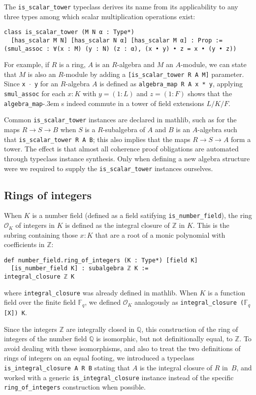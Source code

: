 \documentclass[sn-mathphys]{sn-jnl}%
\newcommand{\lean}[1]{\texttt{#1}\xspace}
\newcommand*{\OK}[1][K]{\mathcal{O}_{#1}}
\newcommand*{\Fq}[1][q]{\mathbb{F}_{#1}}
\newcommand{\mathlib}{\textsf{mathlib}\xspace}
\newcommand{\QQ}{\mathbb{Q}}
\renewcommand{\Z}{\mathbb{Z}}
\begin{document}
The \lean{is\_scalar\_tower} typeclass derives its name from its applicability to any three types among which scalar multiplication operations exist:
\begin{lstlisting}
class is_scalar_tower (M N α : Type*)
  [has_scalar M N] [has_scalar N α] [has_scalar M α] : Prop :=
(smul_assoc : ∀(x : M) (y : N) (z : α), (x • y) • z = x • (y • z))
\end{lstlisting}
For example, if $R$ is a ring, $A$ is an $R$-algebra and $M$ an $A$-module, we can state that $M$ is also an $R$-module by adding a \lean{[is\_scalar\_tower R A M]} parameter.
Since \lean{x~$\cdot$~y} for an $R$-algebra $A$ is defined as \lean{algebra\_map R A x * y}, applying \lean{smul\_assoc} for each $x : K$ with $y = (1 : L)$ and $z = (1 : F)$ shows that the \lean{algebra\_map}\kern-.3em s indeed commute in a tower of field extensions $L / K / F$.

Common \lean{is\_scalar\_tower} instances are declared in \mathlib,
such as for the maps $R \to S \to B$ when $S$ is a $R$-subalgebra of $A$ and $B$ is an $A$-algebra such that \lean{is\_scalar\_tower R A B};
this also implies that the maps $R \to S \to A$ form a tower.
The effect is that almost all coherence proof obligations are automated through typeclass instance synthesis.
Only when defining a new algebra structure were we required to supply the \lean{is\_scalar\_tower} instances ourselves.

\subsection{Rings of integers} \label{sec:ring-of-integers}

When $K$ is a number field (defined as a field satifying \lean{is\_number\_field}), the ring $\OK$ of integers in $K$ is defined as the integral closure of $\Z$ in $K$.
This is the subring containing those $x : K$ that are a root of a monic polynomial with coefficients in $\Z$:
\begin{lstlisting}
def number_field.ring_of_integers (K : Type*) [field K]
  [is_number_field K] : subalgebra ℤ K :=
integral_closure ℤ K
\end{lstlisting}
where \lean{integral\_closure} was already defined in \mathlib.
When $K$ is a function field over the finite field $\Fq$, we defined $\OK$ analogously as \lean{integral\_closure ($\Fq$[X]) K}.

Since the integers $\Z$ are integrally closed in $\QQ$, this construction of the ring of integers of the number field $\QQ$ is isomorphic, but not definitionally equal, to $\Z$.
To avoid dealing with these isomorphisms, and also to treat the two definitions of rings of integers on an equal footing,
we introduced a typeclass \lean{is\_integral\_closure A R B} stating that $A$ is the integral closure of $R$ in~$B$,
and worked with a generic \lean{is\_integral\_closure} instance instead of the specific \lean{ring\_of\_integers} construction when possible.
\end{document}

